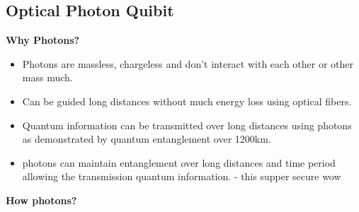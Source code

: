 \subsection{Optical Photon Quibit}

{\bf Why Photons?}
\begin{itemize}
    \item Photons are massless, chargeless and don't interact with each other or other mass much. \cite{nielsen_quantum_2010}
    \item Can be guided long distances without much energy loss using optical fibers. \cite{nielsen_quantum_2010}
    \item Quantum information can be transmitted over long distances using photons as demonstrated by quantum entanglement over 1200km. \cite{yin_satellite-based_2017}
    \item photons can maintain entanglement over long distances and time period allowing the transmission quantum information. - this supper secure wow \cite{thibault_team_nodate}
\end{itemize}

\vspace{1em}
{\bf How photons?}

